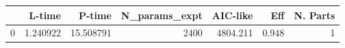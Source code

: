 \begin{tabular}{lrrrrrr}
\toprule
{} &    L-time &     P-time &  N\_params\_expt &  AIC-like &    Eff &  N. Parts \\
\midrule
0 &  1.240922 &  15.508791 &           2400 &  4804.211 &  0.948 &         1 \\
\bottomrule
\end{tabular}
